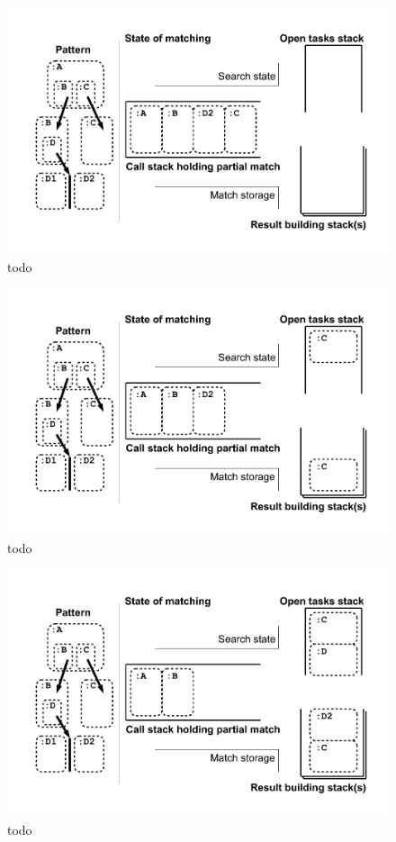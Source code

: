\begin{figure}[htbp]
  \centering
  \includegraphics[width=\textwidth]{fig/Passungszustand8}
  \caption{todo}
  \label{figmatchingstate8}
\end{figure}

\begin{figure}[htbp]
  \centering
  \includegraphics[width=\textwidth]{fig/Passungszustand9}
  \caption{todo}
  \label{figmatchingstate9}
\end{figure}

\begin{figure}[htbp]
  \centering
  \includegraphics[width=\textwidth]{fig/Passungszustand10}
  \caption{todo}
  \label{figmatchingstate10}
\end{figure}

